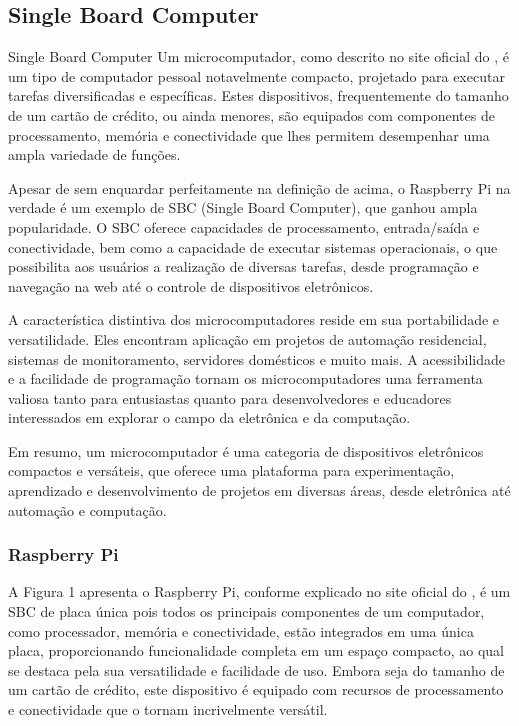 \subsection{Single Board Computer}Single Board Computer
Um microcomputador, como descrito no site oficial do \cite{raspberry}, é um tipo de computador pessoal notavelmente compacto, projetado para executar tarefas diversificadas e específicas. Estes dispositivos, frequentemente do tamanho de um cartão de crédito, ou ainda menores, são equipados com componentes de processamento, memória e conectividade que lhes permitem desempenhar uma ampla variedade de funções.

 Apesar de sem enquardar perfeitamente na definição de acima, o Raspberry Pi na verdade é um exemplo de SBC (Single Board Computer), que ganhou ampla popularidade. O SBC oferece capacidades de processamento, entrada/saída e conectividade, bem como a capacidade de executar sistemas operacionais, o que possibilita aos usuários a realização de diversas tarefas, desde programação e navegação na web até o controle de dispositivos eletrônicos.

A característica distintiva dos microcomputadores reside em sua portabilidade e versatilidade. Eles encontram aplicação em projetos de automação residencial, sistemas de monitoramento, servidores domésticos e muito mais. A acessibilidade e a facilidade de programação tornam os microcomputadores uma ferramenta valiosa tanto para entusiastas quanto para desenvolvedores e educadores interessados em explorar o campo da eletrônica e da computação.

Em resumo, um microcomputador é uma categoria de dispositivos eletrônicos compactos e versáteis, que oferece uma plataforma para experimentação, aprendizado e desenvolvimento de projetos em diversas áreas, desde eletrônica até automação e computação.

\subsubsection{Raspberry Pi}
 A Figura 1 apresenta o Raspberry Pi, conforme explicado no site oficial do \cite{raspberry}, é um SBC de placa única pois todos os principais componentes de um computador, como processador, memória e conectividade, estão integrados em uma única placa, proporcionando funcionalidade completa em um espaço compacto, ao qual se destaca pela sua versatilidade e facilidade de uso. Embora seja do tamanho de um cartão de crédito, este dispositivo é equipado com recursos de processamento e conectividade que o tornam incrivelmente versátil.

